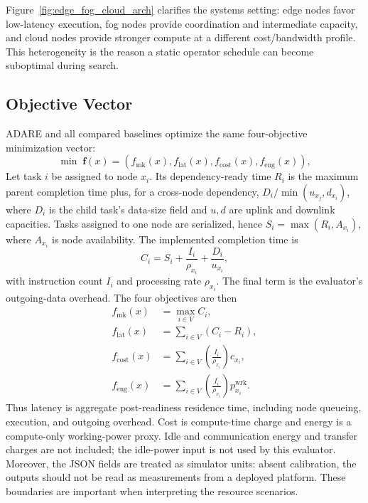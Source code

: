 \documentclass[preprint,12pt]{elsarticle}
\begin{document}
Figure~\ref{fig:edge_fog_cloud_arch} clarifies the systems setting: edge nodes favor low-latency execution, fog nodes provide coordination and intermediate capacity, and cloud nodes provide stronger compute at a different cost/bandwidth profile. This heterogeneity is the reason a static operator schedule can become suboptimal during search.

\subsection{Objective Vector}
ADARE and all compared baselines optimize the same four-objective minimization vector:
\begin{equation}
\min \; \mathbf{f}(x) = \left(f_{\mathrm{mk}}(x), f_{\mathrm{lat}}(x), f_{\mathrm{cost}}(x), f_{\mathrm{eng}}(x)\right),
\end{equation}
Let task $i$ be assigned to node $x_i$. Its dependency-ready time $R_i$ is the maximum parent completion time plus, for a cross-node dependency, $D_i/\min(u_{x_j},d_{x_i})$, where $D_i$ is the child task's data-size field and $u,d$ are uplink and downlink capacities. Tasks assigned to one node are serialized, hence $S_i=\max(R_i,A_{x_i})$, where $A_{x_i}$ is node availability. The implemented completion time is
\begin{equation}
C_i=S_i+\frac{I_i}{\rho_{x_i}}+\frac{D_i}{u_{x_i}},
\end{equation}
with instruction count $I_i$ and processing rate $\rho_{x_i}$. The final term is the evaluator's outgoing-data overhead. The four objectives are then
\begin{equation}
\label{eq:objective_metrics}
\begin{aligned}
f_{\mathrm{mk}}(x) &= \max_{i \in V} C_i, \\
f_{\mathrm{lat}}(x) &= \sum_{i \in V} \left(C_i - R_i\right), \\
f_{\mathrm{cost}}(x) &= \sum_{i \in V} \left(\frac{I_i}{\rho_{x_i}}\right) c_{x_i}, \\
f_{\mathrm{eng}}(x) &= \sum_{i \in V} \left(\frac{I_i}{\rho_{x_i}}\right) p^{\mathrm{wrk}}_{x_i}.
\end{aligned}
\end{equation}
Thus latency is aggregate post-readiness residence time, including node queueing, execution, and outgoing overhead. Cost is compute-time charge and energy is a compute-only working-power proxy. Idle and communication energy and transfer charges are not included; the idle-power input is not used by this evaluator. Moreover, the JSON fields are treated as simulator units: absent calibration, the outputs should not be read as measurements from a deployed platform. These boundaries are important when interpreting the resource scenarios.
\end{document}
